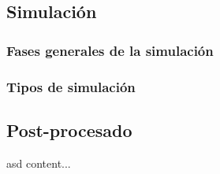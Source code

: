 \documentclass[12pt]{beamer}
\begin{document}
\subsection{Simulación}

\subsubsection{Fases generales de la simulación}

\subsubsection{Tipos de simulación}

\subsection{Post-procesado}

\begin{frame}{asd}
	content...
\end{frame}
\end{document}
